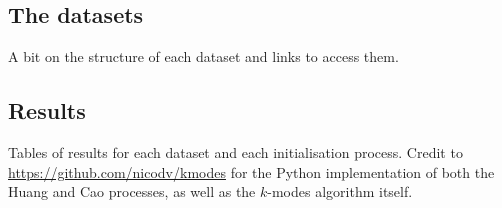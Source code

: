 \subsection{The datasets}\label{subsec:datasets}

A bit on the structure of each dataset and links to access them.


\subsection{Results}\label{subsec:results}

Tables of results for each dataset and each initialisation process. Credit to 
\url{https://github.com/nicodv/kmodes} for the Python implementation of both the
Huang and Cao processes, as well as the $k$-modes algorithm itself.

\begin{table}[H]
\resizebox{\textwidth}{!}{%
\centering
    
}
\end{table}
